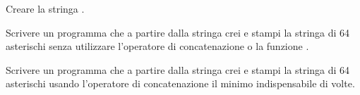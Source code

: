 \begin{Exercise}[label=string-03]
Creare la stringa .
\end{Exercise}

\begin{Exercise}[label=string-04]
Scrivere un programma che a partire dalla stringa  crei e stampi la
stringa di 64 asterischi senza utilizzare l'operatore di concatenazione o la
funzione .
\end{Exercise}

\begin{Exercise}[label=string-05]
Scrivere un programma che a partire dalla stringa  crei e stampi
la stringa di 64 asterischi usando l'operatore di concatenazione il minimo
indispensabile di volte.
\end{Exercise}

